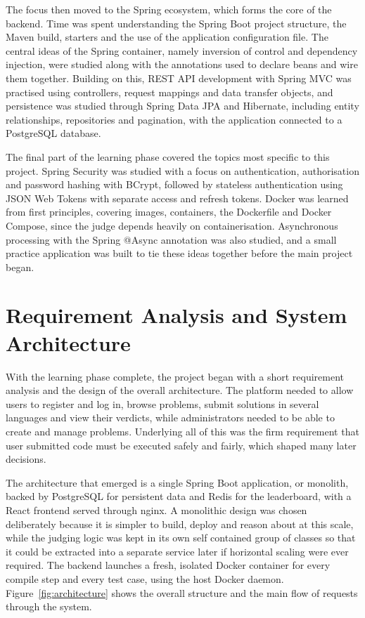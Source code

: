 \documentclass[12pt,a4paper]{report}
\begin{document}
The focus then moved to the Spring ecosystem, which forms the core of the backend. Time was spent understanding the Spring Boot project structure, the Maven build, starters and the use of the application configuration file. The central ideas of the Spring container, namely inversion of control and dependency injection, were studied along with the annotations used to declare beans and wire them together. Building on this, REST API development with Spring MVC was practised using controllers, request mappings and data transfer objects, and persistence was studied through Spring Data JPA and Hibernate, including entity relationships, repositories and pagination, with the application connected to a PostgreSQL database.

The final part of the learning phase covered the topics most specific to this project. Spring Security was studied with a focus on authentication, authorisation and password hashing with BCrypt, followed by stateless authentication using JSON Web Tokens with separate access and refresh tokens. Docker was learned from first principles, covering images, containers, the Dockerfile and Docker Compose, since the judge depends heavily on containerisation. Asynchronous processing with the Spring {\ttfamily @Async} annotation was also studied, and a small practice application was built to tie these ideas together before the main project began.

\section*{Requirement Analysis and System Architecture}
With the learning phase complete, the project began with a short requirement analysis and the design of the overall architecture. The platform needed to allow users to register and log in, browse problems, submit solutions in several languages and view their verdicts, while administrators needed to be able to create and manage problems. Underlying all of this was the firm requirement that user submitted code must be executed safely and fairly, which shaped many later decisions.

The architecture that emerged is a single Spring Boot application, or monolith, backed by PostgreSQL for persistent data and Redis for the leaderboard, with a React frontend served through nginx. A monolithic design was chosen deliberately because it is simpler to build, deploy and reason about at this scale, while the judging logic was kept in its own self contained group of classes so that it could be extracted into a separate service later if horizontal scaling were ever required. The backend launches a fresh, isolated Docker container for every compile step and every test case, using the host Docker daemon. Figure~\ref{fig:architecture} shows the overall structure and the main flow of requests through the system.
\end{document}
